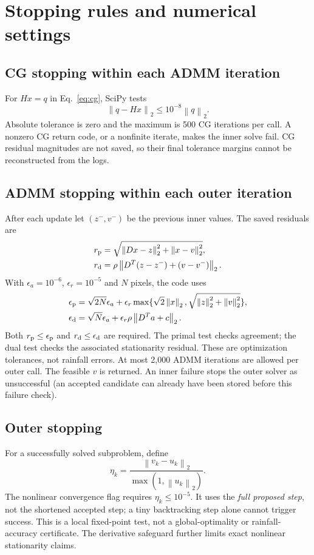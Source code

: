 \documentclass[11pt,a4paper]{article}
\newcommand{\norm}[1]{\left\lVert#1\right\rVert}
\begin{document}
\section{Stopping rules and numerical settings}
\subsection{CG stopping within each ADMM iteration}
For $Hx=q$ in Eq.~\eqref{eq:cg}, SciPy tests
\[
 \norm{q-Hx}_2\le 10^{-8}\norm q_2.
\]
Absolute tolerance is zero and the maximum is 500 CG iterations per call. A nonzero CG return code, or a nonfinite iterate, makes the inner solve fail. CG residual magnitudes are not saved, so their final tolerance margins cannot be reconstructed from the logs.
\subsection{ADMM stopping within each outer iteration}
After each update let $(z^-,v^-)$ be the previous inner values. The saved residuals are
\begin{align*}
 r_{\rm p}&=\sqrt{\norm{Dx-z}_2^2+\norm{x-v}_2^2},\\
 r_{\rm d}&=\rho\norm{D^T(z-z^-)+(v-v^-)}_2.
\end{align*}
With $\epsilon_a=10^{-6}$, $\epsilon_r=10^{-5}$ and $N$ pixels, the code uses
\begin{align*}
 \epsilon_{\rm p}&=\sqrt{2N}\epsilon_a+
 \epsilon_r\max\{\sqrt2\norm x_2,\sqrt{\norm z_2^2+\norm v_2^2}\},\\
 \epsilon_{\rm d}&=\sqrt N\epsilon_a+
 \epsilon_r\rho\norm{D^Ta+c}_2.
\end{align*}
Both $r_{\rm p}\le\epsilon_{\rm p}$ and $r_{\rm d}\le\epsilon_{\rm d}$ are required. The primal test checks agreement; the dual test checks the associated stationarity residual. These are optimization tolerances, not rainfall errors. At most 2,000 ADMM iterations are allowed per outer call. The feasible $v$ is returned. An inner failure stops the outer solver as unsuccessful (an accepted candidate can already have been stored before this failure check).
\subsection{Outer stopping}
For a successfully solved subproblem, define
\begin{equation}
 \eta_k=\frac{\norm{v_k-u_k}_2}{\max(1,\norm{u_k}_2)}.
\end{equation}
The nonlinear convergence flag requires $\eta_k\le10^{-5}$. It uses the \emph{full proposed step}, not the shortened accepted step; a tiny backtracking step alone cannot trigger success. This is a local fixed-point test, not a global-optimality or rainfall-accuracy certificate. The derivative safeguard further limits exact nonlinear stationarity claims.
\end{document}
